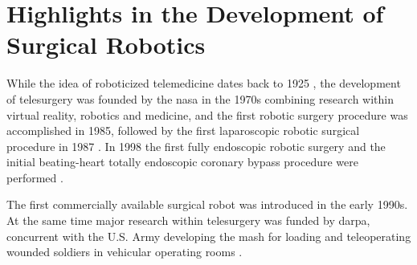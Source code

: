 \section{Highlights in the Development of Surgical Robotics}

\vspace{-1mm}
While the idea of roboticized telemedicine dates back to 1925 \citep{bib:telemed_predict}, the development of telesurgery was founded by the \gls{nasa} in the 1970s %
combining research within virtual reality, robotics and medicine, %
and the first robotic surgery procedure was accomplished in 1985, %
followed by the first laparoscopic robotic surgical procedure in 1987 \citep{bib:telesurg_history,bib:brown_univ}.
In 1998 the first fully endoscopic robotic surgery and the initial beating-heart totally endoscopic coronary bypass procedure were performed \citep{bib:brown_univ}.



The first commercially available surgical robot was introduced in the early 1990s. At the same time major research within telesurgery was funded by \gls{darpa}, %
concurrent with the U.S. Army developing the \gls{mash} for loading and teleoperating wounded soldiers in vehicular operating rooms \citep{bib:telesurg_history,bib:brown_univ}.


